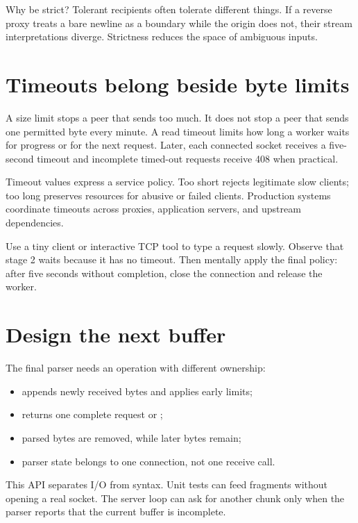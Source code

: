 Why be strict? Tolerant recipients often tolerate different things. If a reverse
proxy treats a bare newline as a boundary while the origin does not, their stream
interpretations diverge. Strictness reduces the space of ambiguous inputs.

\section{Timeouts belong beside byte limits}

A size limit stops a peer that sends too much. It does not stop a peer that sends
one permitted byte every minute. A read timeout limits how long a worker waits
for progress or for the next request. Later, each connected socket receives a
five-second timeout and incomplete timed-out requests receive 408 when practical.

Timeout values express a service policy. Too short rejects legitimate slow
clients; too long preserves resources for abusive or failed clients. Production
systems coordinate timeouts across proxies, application servers, and upstream
dependencies.

\begin{tryit}
Use a tiny client or interactive TCP tool to type a request slowly. Observe that
stage 2 waits because it has no timeout. Then mentally apply the final policy:
after five seconds without completion, close the connection and release the
worker.
\end{tryit}

\section{Design the next buffer}

The final parser needs an operation with different ownership:

\begin{itemize}
  \item {} appends newly received bytes and applies early limits;
  \item {} returns one complete request or ;
  \item parsed bytes are removed, while later bytes remain;
  \item parser state belongs to one connection, not one receive call.
\end{itemize}

This API separates I/O from syntax. Unit tests can feed fragments without opening
a real socket. The server loop can ask for another chunk only when the parser
reports that the current buffer is incomplete.

